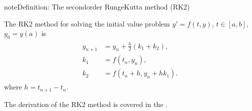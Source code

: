 \documentclass[letterpaper,10pt,english]{jupyterBook}
\begin{document}
\begin{sphinxadmonition}{note}{Definition: The second\sphinxhyphen{}order Runge\sphinxhyphen{}Kutta method (RK2)}

\sphinxAtStartPar
The RK2 method for solving the initial value problem \(y' = f(t, y)\), \(t \in [a, b]\), \(y_0 = y(a)\) is
\begin{equation}\label{equation:1_IVPs/1.4_RK2:rk2-equation}
\begin{split}\begin{align*}
    y_{n+1} &= y_n + \frac{h}{2}(k_1 + k_2),\\
    k_1 &= f(t_n, y_n), \\
    k_2 &= f(t_n + h, y_n + h k_1).
\end{align*} \end{split}
\end{equation}
\sphinxAtStartPar
where \(h = t_{n+1} - t_n\).
\end{sphinxadmonition}

\sphinxAtStartPar
The derivation of the RK2 method is covered in the {\hyperref[\detokenize{2_ERKs/2.1_ERK_Derivation:rk2-derivation-section}]{}}.
\end{document}
